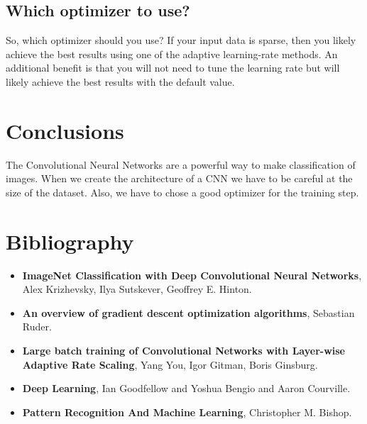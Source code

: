 \documentclass[12pt]{article}
\begin{document}
\subsection*{Which optimizer to use?}
\hspace*{10mm}So, which optimizer should you use? If your input data is sparse, then you likely achieve the best results using one of the adaptive learning-rate methods. An additional benefit is that you will not need to tune the learning rate but will likely achieve the best results with the default value.


\section*{Conclusions}
\hspace*{10mm}The Convolutional Neural Networks are a powerful way to make classification of images. When we create the architecture of a CNN we have to be careful at the size of the dataset. Also, we have to chose a good optimizer for the training step.

\section*{Bibliography} 
\begin{itemize}
	\item \textbf{ImageNet Classification with Deep Convolutional Neural Networks}, Alex Krizhevsky, Ilya Sutskever, Geoffrey E. Hinton.
	\item \textbf{An overview of gradient descent optimization algorithms}, Sebastian Ruder.
	\item \textbf{Large batch training of Convolutional Networks with Layer-wise Adaptive Rate Scaling}, Yang You, Igor Gitman, Boris Ginsburg.
	\item \textbf{Deep Learning}, Ian Goodfellow and Yoshua Bengio and Aaron Courville.
	\item \textbf{Pattern Recognition And Machine Learning}, Christopher M. Bishop.
\end{itemize}
\end{document}
